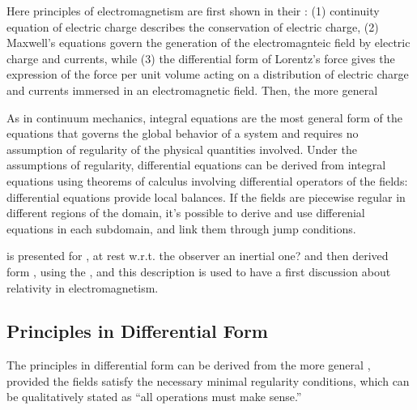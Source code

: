 \documentclass[letterpaper,10pt,english]{jupyterBook}
\begin{document}
\sphinxAtStartPar
Here principles of electromagnetism are first shown in their {\hyperref[\detokenize{ch/principles-vacuum:classical-electromagnetism-principles-differential}]{}}: (1) continuity equation of electric charge describes the conservation of electric charge, (2) Maxwell’s equations govern the generation of the electromagnteic field by electric charge and currents, while (3) the differential form of Lorentz’s force gives the expression of the force per unit volume acting on a distribution of electric charge and currents immersed in an electromagnetic field. Then, the more general {\hyperref[\detokenize{ch/principles-vacuum:classical-electromagnetism-principles-integral}]{}}%
\begin{footnote}[1]\sphinxAtStartFootnote
As in continuum mechanics, integral equations are the most general form of the equations that governs the global behavior of a system and requires no assumption of regularity of the physical quantities involved. Under the assumptions of regularity, differential equations can be derived from integral equations using theorems of calculus involving differential operators of the fields: differential equations provide local balances. If the fields are piece\sphinxhyphen{}wise regular in different regions of the domain, it’s possible to derive and use differenial equations in each sub\sphinxhyphen{}domain, and link them through jump conditions.
%
\end{footnote} is presented for {\hyperref[\detokenize{ch/principles-vacuum:classical-electromagnetism-principles-integral-control-volume}]{}}, at rest w.r.t. the observer \sphinxhyphen{} an inertial one? \sphinxhyphen{} and then derived form {\hyperref[\detokenize{ch/principles-vacuum:classical-electromagnetism-principles-integral-arbitrary-volume}]{}}, using the , and this description is used to have a first discussion about relativity in electromagnetism.


\subsection{Principles in Differential Form}
\label{\detokenize{ch/principles-vacuum:principles-in-differential-form}}\label{\detokenize{ch/principles-vacuum:classical-electromagnetism-principles-differential}}
\sphinxAtStartPar
The principles in differential form can be derived from the more general {\hyperref[\detokenize{ch/principles-vacuum:classical-electromagnetism-principles-integral}]{}}, provided the fields satisfy the necessary minimal regularity conditions, which can be qualitatively stated as “all operations must make sense.”
\end{document}
